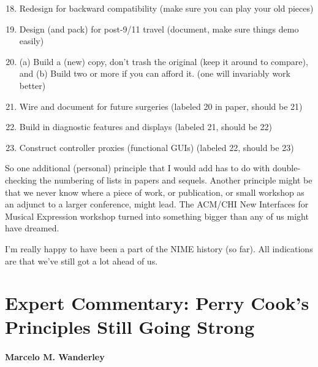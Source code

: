 \begin{enumerate}
 \setcounter{enumi}{17}
\item Redesign for backward compatibility (make sure you can play your old pieces)
\item Design (and pack) for post-9/11 travel (document, make sure things demo easily)
\item (a) Build a (new) copy, don't trash the original (keep it around to compare), and (b) Build two or more if you can afford it. (one will invariably work better)
\item Wire and document for future surgeries  (labeled 20 in paper, should be 21)
\item Build in diagnostic features and displays (labeled 21, should be 22)  
\item Construct controller proxies (functional GUIs) (labeled 22, should be 23)
\end{enumerate}

So one additional (personal) principle that I would add has to do with double-checking the numbering of lists in papers and sequels.  Another principle might be that we never know where a piece of work, or publication, or small workshop as an adjunct to a larger conference, might lead.  The ACM/CHI New Interfaces for Musical Expression workshop turned into something bigger than any of us might have dreamed.

I'm really happy to have been a part of the NIME history (so far).  All indications are that we've still got a lot ahead of us.


\section*{Expert Commentary: Perry Cook's Principles Still Going Strong}

\paragraph{Marcelo M. Wanderley}

